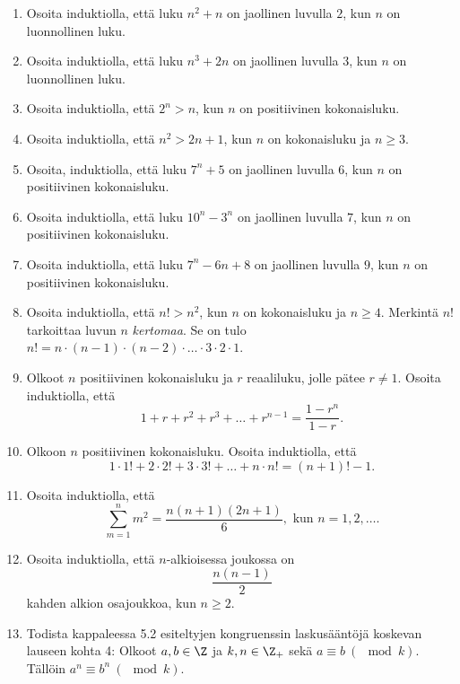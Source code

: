 \begin{enumerate}

\item Osoita induktiolla, että luku $n^2+n$ on jaollinen luvulla $2$, kun $n$ on luonnollinen luku.

\item Osoita induktiolla, että luku $n^3+2n$ on jaollinen luvulla $3$, kun $n$ on luonnollinen luku.

\item Osoita induktiolla, että $2^n > n$, kun $n$ on positiivinen kokonaisluku.

\item Osoita induktiolla, että $n^2 > 2n + 1$, kun $n$ on kokonaisluku ja $n \ge 3$.

\item Osoita, induktiolla, että luku $7^n + 5$ on jaollinen luvulla $6$, kun $n$ on positiivinen kokonaisluku.

\item Osoita induktiolla, että luku $10^n - 3^n$ on jaollinen luvulla $7$, kun $n$ on positiivinen kokonaisluku.

\item Osoita induktiolla, että luku $7^n - 6n + 8$ on jaollinen luvulla $9$, kun $n$ on positiivinen kokonaisluku.

\item Osoita induktiolla, että $n! > n^2$, kun $n$ on kokonaisluku ja $n \ge 4$. Merkintä $n!$ tarkoittaa luvun $n$ {\em kertomaa}. Se on tulo $n! = n \cdot (n-1) \cdot (n-2) \cdot \ldots \cdot 3 \cdot 2 \cdot 1$.

\item Olkoot $n$ positiivinen kokonaisluku ja $r$ reaaliluku, jolle pätee $r \neq 1$. Osoita induktiolla, että 
\[
1 + r + r^2 + r^3 + \ldots + r^{n-1} = \frac{1-r^n}{1-r}.
\]

\item Olkoon $n$ positiivinen kokonaisluku. Osoita induktiolla, että 
\[
1 \cdot 1! + 2 \cdot 2! + 3 \cdot 3! + \ldots + n \cdot n! = (n + 1)! - 1.
\]

\item 
Osoita induktiolla, että 
\[
\sum_{m=1}^n m^2= \frac{n(n+1)(2n+1)}{6}, \textrm{ kun } n=1,2,\ldots.
\]

\item
Osoita induktiolla, että $n$-alkioisessa joukossa on
\[
\frac{n(n-1)}{2}
\]
kahden alkion osajoukkoa, kun $n \ge 2$.

\item Todista kappaleessa 5.2 esiteltyjen kongruenssin laskusääntöjä koskevan lauseen kohta 4: Olkoot $a, b \in \Z$ ja $k,n \in \Z_+$ sekä $a \equiv b\ (\mod k)$. Tällöin $a^n \equiv b^n\ (\mod k)$.


\end{enumerate}

